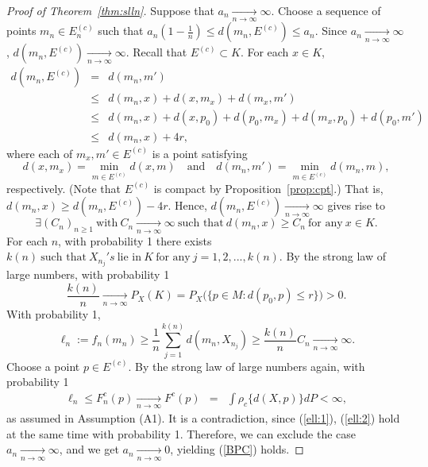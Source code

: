 \documentclass[preprint]{imsart}
\theoremstyle{plain}
\theoremstyle{remark}
\begin{document}
\begin{appendix}
\begin{proof}[Proof of Theorem~\ref{thm:slln}]
Suppose that $a_{n} \underset{n \rightarrow \infty}{\rightarrow} \infty$. Choose a sequence of points $m_{n} \in E^{(c)}_{n}$ such that $a_{n}(1-\frac{1}{n}) \le d(m_{n}, E^{(c)}) \le a_{n}$.
Since $a_{n} \underset{n \rightarrow \infty}{\rightarrow} \infty$, $d(m_{n}, E^{(c)}) \underset{n \rightarrow \infty}{\rightarrow} \infty$. Recall that $E^{(c)} \subset K$. For each $x \in K$,
\begin{eqnarray*}
d(m_{n}, E^{(c)}) &=& d(m_{n}, m') \\
&\le& d(m_{n}, x) + d(x, m_{x}) + d(m_{x}, m') \\
&\le& d(m_{n}, x) + d(x, p_0) + d(p_0, m_{x}) + d(m_{x}, p_0) + d(p_0, m') \\
&\le& d(m_{n}, x) + 4r,
\end{eqnarray*}
where each of $m_{x}, m' \in E^{(c)}$ is a point satisfying $$d(x, m_{x}) = \min_{m \in E^{(c)}}d(x, m) \quad \mbox{and} \quad d(m_{n}, m')= \min_{m \in E^{(c)}}d(m_{n}, m),$$ respectively. (Note that $E^{(c)}$ is compact by Proposition~\ref{prop:cpt}.) That is, $d(m_{n}, x) \ge d(m_{n}, E^{(c)}) - 4r$. Hence, $d(m_{n}, E^{(c)}) \underset{n\rightarrow \infty}{\rightarrow} \infty$ gives rise to 
\[
\exists (C_{n})_{n \ge 1} ~ \mbox{with} ~ C_{n} \underset{n \rightarrow \infty}{\rightarrow} \infty ~ \mbox{such that} ~ d(m_{n}, x) \ge C_{n} ~ \mbox{for any} ~ x \in K.
\]
For each $n$, with probability 1 there exists $k(n) ~ \mbox{such that} ~ X_{n_{j}}'s ~ \mbox{lie in}~ K ~ \mbox{for any} ~ j=1, 2, ..., k(n).$ By the strong law of large numbers, with probability 1
\[
\frac{k(n)}{n} \underset{n \rightarrow \infty}{\rightarrow} P_{X}(K) = P_{X}\big(\{p \in M: d(p_0, p) \le r\}\big) > 0.
\]
With probability 1,
\begin{equation}\label{ell:1}
\ell_{n}:= f_{n}(m_{n}) \ge \frac{1}{n} \sum_{j=1}^{k(n)} d(m_{n}, X_{n_{j}}) \ge \frac{k(n)}{n} C_{n} \underset{n \rightarrow \infty}{\rightarrow} \infty.
\end{equation}
Choose a point $p \in E^{(c)}$. By the strong law of large numbers again, with probability 1 
\begin{eqnarray}\label{ell:2}
\ell_{n} \le F^{c}_{n}(p) \underset{n \rightarrow \infty}{\rightarrow} F^{c}(p) &=& \int \rho_{c}\{d(X, p)\}dP < \infty,
\end{eqnarray}
as assumed in Assumption (A1). It is a contradiction, since (\ref{ell:1}), (\ref{ell:2}) hold at the same time with probability 1. Therefore, we can exclude the case $a_{n} \underset{n \rightarrow \infty}{\rightarrow} \infty$, and we get $a_{n} \underset{n \rightarrow \infty}{\rightarrow} 0$, yielding (\ref{BPC}) holds. 


\end{proof}
\end{appendix}
\end{document}
